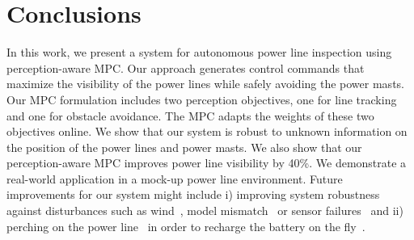\section{Conclusions} \label{sec:Conclusions}

In this work, we present a system for autonomous power line inspection using perception-aware MPC. Our approach generates control commands that maximize the visibility of the power lines while safely avoiding the power masts. Our MPC formulation includes two perception objectives, one for line tracking and one for obstacle avoidance. The MPC adapts the weights of these two objectives online.  We show that our system is robust to unknown information on the position of the power lines and power masts. We also show that our perception-aware MPC improves power line visibility by 40\%. We demonstrate a real-world application in a mock-up power line environment. Future improvements for our system might include i) improving system robustness against disturbances such as wind~\cite{cioffi2023hdvio}, model mismatch~\cite{bauersfeld2021neurobem} or sensor failures~\cite{sun2022see} and ii) perching on the power line~\cite{paneque2022perception} in order to recharge the battery on the fly~\cite{kitchen2020design}.